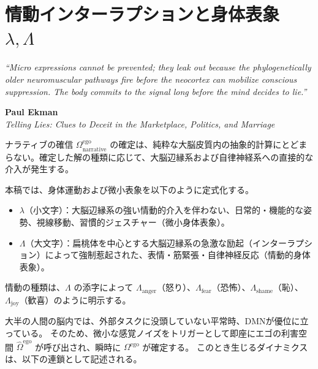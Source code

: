 \chapter{情動インターラプションと身体表象 $\lambda, \Lambda$}
\epigraph{%
  \itshape ``Micro expressions cannot be prevented; they leak out because
  the phylogenetically older neuromuscular pathways fire before
  the neocortex can mobilize conscious suppression.
  The body commits to the signal long before the mind decides to lie.''
}{%
  \textbf{Paul Ekman}\\
  \textit{Telling Lies: Clues to Deceit in the Marketplace, Politics, and Marriage}
}
ナラティブの確信 $\Omega^{\mathrm{ego}}_{\mathrm{narrative}}$ の確定は、純粋な大脳皮質内の抽象的計算にとどまらない。確定した解の種類に応じて、大脳辺縁系および自律神経系への直接的な介入が発生する。

本稿では、身体運動および微小表象を以下のように定式化する。
\begin{itemize}
  \item $\lambda$（小文字）：大脳辺縁系の強い情動的介入を伴わない、日常的・機能的な姿勢、視線移動、習慣的ジェスチャー（微小身体表象）。
  \item $\Lambda$（大文字）：扁桃体を中心とする大脳辺縁系の急激な励起（インターラプション）によって強制惹起された、表情・筋緊張・自律神経反応（情動的身体表象）。
\end{itemize}

情動の種類は、$\Lambda$ の添字によって $\Lambda_{\mathrm{anger}}$（怒り）、$\Lambda_{\mathrm{fear}}$（恐怖）、$\Lambda_{\mathrm{shame}}$（恥）、$\Lambda_{\mathrm{joy}}$（歓喜）のように明示する。

大半の人間の脳内では、外部タスクに没頭していない平常時、DMNが優位に立っている。
そのため、微小な感覚ノイズをトリガーとして即座にエゴの利害空間 $\hat{\Omega}^{\mathrm{ego}}$ が呼び出され、瞬時に $\Omega^{\mathrm{ego}}$ が確定する。
このとき生じるダイナミクスは、以下の連鎖として記述される。

